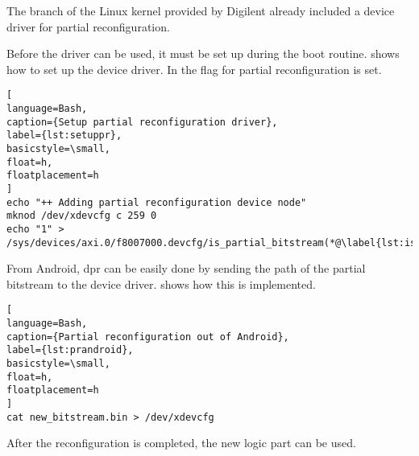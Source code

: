 The branch of the Linux kernel provided by Digilent \cite{DigilentLinux} already included a device driver for partial reconfiguration.

Before the driver can be used, it must be set up during the boot routine.  shows how to set up the device driver. In  the flag for partial reconfiguration is set.

\begin{lstlisting}[
language=Bash,
caption={Setup partial reconfiguration driver},
label={lst:setuppr},
basicstyle=\small,
float=h,
floatplacement=h
]
echo "++ Adding partial reconfiguration device node"
mknod /dev/xdevcfg c 259 0
echo "1" > /sys/devices/axi.0/f8007000.devcfg/is_partial_bitstream(*@\label{lst:ispart}@*)
\end{lstlisting}

From Android, \gls{dpr} can be easily done by sending the path of the partial bitstream to the device driver.  shows how this is implemented.

\begin{lstlisting}[
language=Bash,
caption={Partial reconfiguration out of Android},
label={lst:prandroid},
basicstyle=\small,
float=h,
floatplacement=h
]
cat new_bitstream.bin > /dev/xdevcfg
\end{lstlisting}

After the reconfiguration is completed, the new logic part can be used.
